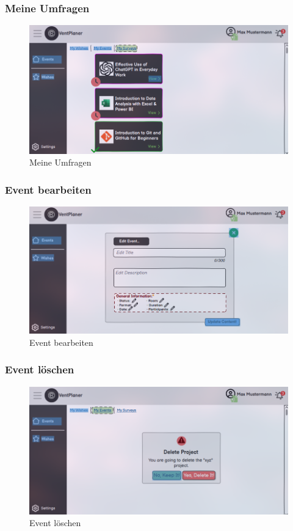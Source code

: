 \documentclass[a4paper,12pt]{article}
\begin{document}
\subsubsection{Meine Umfragen}
  \begin{figure}[H]
      \centering
      \includegraphics[width=1\textwidth]{Abbildungen/events/my_surveys.png}
      \caption{Meine Umfragen}
      \label{fig:my_survey}
    \end{figure}
\subsubsection{Event bearbeiten}
\begin{figure}[H]
    \centering
    \includegraphics[width=1\textwidth]{Abbildungen/events/edit_event.png}
    \caption{Event bearbeiten}
    \label{fig:cedit_event}
  \end{figure}
\subsubsection{Event löschen}
\begin{figure}[H]
    \centering
    \includegraphics[width=1\textwidth]{Abbildungen/events/delete_event.png}
    \caption{Event löschen}
    \label{fig:delet_event}
  \end{figure}
\end{document}
